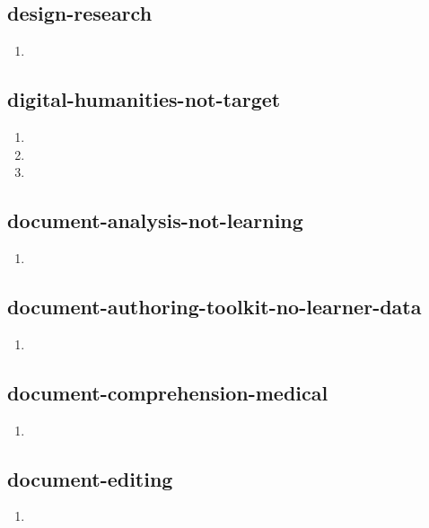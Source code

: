 \documentclass{article}
\begin{document}
\subsection{design-research}
\begin{enumerate}
\item {}
\end{enumerate}

\subsection{digital-humanities-not-target}
\begin{enumerate}
\item {}
\item {}
\item {}
\end{enumerate}

\subsection{document-analysis-not-learning}
\begin{enumerate}
\item {}
\end{enumerate}

\subsection{document-authoring-toolkit-no-learner-data}
\begin{enumerate}
\item {}
\end{enumerate}

\subsection{document-comprehension-medical}
\begin{enumerate}
\item {}
\end{enumerate}

\subsection{document-editing}
\begin{enumerate}
\item {}
\end{enumerate}
\end{document}
